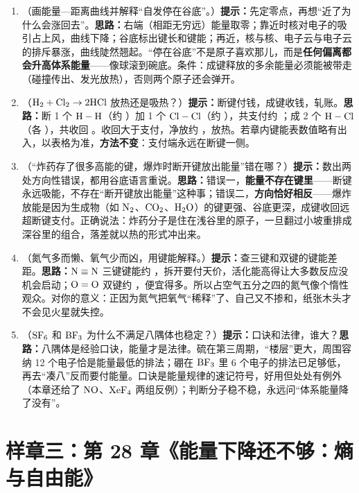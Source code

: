 \begin{enumerate}[itemsep=3pt]
\item （画能量—距离曲线并解释“自发停在谷底”。）\textbf{提示：}先定零点，再想“近了为什么会涨回去”。\textbf{思路：}右端（相距无穷远）能量取零；靠近时核对电子的吸引占上风，曲线下降；谷底标出键长和键能；再近，核与核、电子云与电子云的排斥暴涨，曲线陡然翘起。“停在谷底”不是原子喜欢那儿，而是\textbf{任何偏离都会升高体系能量}——像球滚到碗底。条件：成键释放的多余能量必须能被带走（碰撞传出、发光放热），否则两个原子还会弹开。
\item （$\mathrm{H_2} + \mathrm{Cl_2} \rightarrow \mathrm{2HCl}$ 放热还是吸热？）\textbf{提示：}断键付钱，成键收钱，轧账。\textbf{思路：}断 1 个 $\mathrm{H-H}$（约 ）加 1 个 $\mathrm{Cl-Cl}$（约 ），共支付约 ；成 2 个 $\mathrm{H-Cl}$（各 ），共收回 。收回大于支付，净放约 ，放热。若章内键能表数值略有出入，以表格为准，\textbf{方法不变}：支付端永远在断键一侧。
\item （“炸药存了很多高能的键，爆炸时断开键放出能量”错在哪？）\textbf{提示：}数出两处方向性错误，都用谷底语言重说。\textbf{思路：}错误一，\textbf{能量不存在键里}——断键永远吸能，不存在“断开键放出能量”这种事；错误二，\textbf{方向恰好相反}——爆炸放能是因为生成物（如 $\mathrm{N_2}$、$\mathrm{CO_2}$、$\mathrm{H_2O}$）的键更强、谷底更深，成键收回远超断键支付。正确说法：炸药分子是住在浅谷里的原子，一旦翻过小坡重排成深谷里的组合，落差就以热的形式冲出来。
\item （氮气多而懒、氧气少而凶，用键能解释。）\textbf{提示：}查三键和双键的键能差距。\textbf{思路：}$\mathrm{N \equiv N}$ 三键键能约 ，拆开要付天价，活化能高得让大多数反应没机会启动；$\mathrm{O=O}$ 双键约 ，便宜得多。所以占空气五分之四的氮气像个惰性观众。对你的意义：正因为氮气把氧气“稀释”了、自己又不掺和，纸张木头才不会见火星就失控。
\item （$\mathrm{SF_6}$ 和 $\mathrm{BF_3}$ 为什么不满足八隅体也稳定？）\textbf{提示：}口诀和法律，谁大？\textbf{思路：}八隅体是经验口诀，能量才是法律。硫在第三周期，“楼层”更大，周围容纳 12 个电子恰是能量最低的排法；硼在 $\mathrm{BF_3}$ 里 6 个电子的排法已足够低，再去“凑八”反而要付能量。口诀是能量规律的速记符号，好用但处处有例外（本章还给了 $\mathrm{NO}$、$\mathrm{XeF_4}$ 两组反例）；判断分子稳不稳，永远问“体系能量降了没有”。
\end{enumerate}

\section{样章三：第 28 章《能量下降还不够：熵与自由能》}


